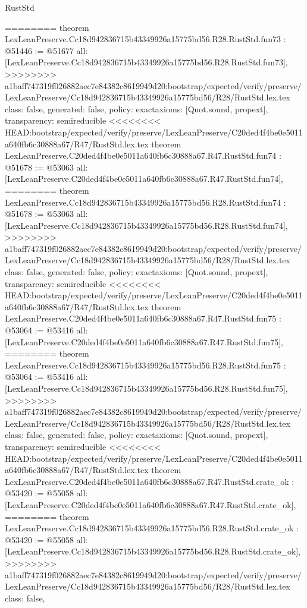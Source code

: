 \begin{lexlean}{RustStd}
\begin{coremodule}
{\begin{coremodule}
{{{{{{{{{{{{{{{{{{{{{{{{{{{{{{{{{{{{{{{{{{{{{{{{{{{{{{{{{{{{{{{{{{{{{{{{{{{{========
theorem LexLeanPreserve.Cc18d942836715b43349926a15775bd56.R28.RustStd.fun73 : @51446 := @51677 {
  all: [LexLeanPreserve.Cc18d942836715b43349926a15775bd56.R28.RustStd.fun73],
>>>>>>>> a1baff747319f026882aec7e84382c8619949d20:bootstrap/expected/verify/preserve/LexLeanPreserve/Cc18d942836715b43349926a15775bd56/R28/RustStd.lex.tex
  class: false,
  generated: false,
  policy: exact{axioms: [Quot.sound, propext]},
  transparency: semireducible
}
<<<<<<<< HEAD:bootstrap/expected/verify/preserve/LexLeanPreserve/C20ded4f4be0e5011a640fb6c30888a67/R47/RustStd.lex.tex
theorem LexLeanPreserve.C20ded4f4be0e5011a640fb6c30888a67.R47.RustStd.fun74 : @51678 := @53063 {
  all: [LexLeanPreserve.C20ded4f4be0e5011a640fb6c30888a67.R47.RustStd.fun74],
========
theorem LexLeanPreserve.Cc18d942836715b43349926a15775bd56.R28.RustStd.fun74 : @51678 := @53063 {
  all: [LexLeanPreserve.Cc18d942836715b43349926a15775bd56.R28.RustStd.fun74],
>>>>>>>> a1baff747319f026882aec7e84382c8619949d20:bootstrap/expected/verify/preserve/LexLeanPreserve/Cc18d942836715b43349926a15775bd56/R28/RustStd.lex.tex
  class: false,
  generated: false,
  policy: exact{axioms: [Quot.sound, propext]},
  transparency: semireducible
}
<<<<<<<< HEAD:bootstrap/expected/verify/preserve/LexLeanPreserve/C20ded4f4be0e5011a640fb6c30888a67/R47/RustStd.lex.tex
theorem LexLeanPreserve.C20ded4f4be0e5011a640fb6c30888a67.R47.RustStd.fun75 : @53064 := @53416 {
  all: [LexLeanPreserve.C20ded4f4be0e5011a640fb6c30888a67.R47.RustStd.fun75],
========
theorem LexLeanPreserve.Cc18d942836715b43349926a15775bd56.R28.RustStd.fun75 : @53064 := @53416 {
  all: [LexLeanPreserve.Cc18d942836715b43349926a15775bd56.R28.RustStd.fun75],
>>>>>>>> a1baff747319f026882aec7e84382c8619949d20:bootstrap/expected/verify/preserve/LexLeanPreserve/Cc18d942836715b43349926a15775bd56/R28/RustStd.lex.tex
  class: false,
  generated: false,
  policy: exact{axioms: [Quot.sound, propext]},
  transparency: semireducible
}
<<<<<<<< HEAD:bootstrap/expected/verify/preserve/LexLeanPreserve/C20ded4f4be0e5011a640fb6c30888a67/R47/RustStd.lex.tex
theorem LexLeanPreserve.C20ded4f4be0e5011a640fb6c30888a67.R47.RustStd.crate_ok : @53420 := @55058 {
  all: [LexLeanPreserve.C20ded4f4be0e5011a640fb6c30888a67.R47.RustStd.crate_ok],
========
theorem LexLeanPreserve.Cc18d942836715b43349926a15775bd56.R28.RustStd.crate_ok : @53420 := @55058 {
  all: [LexLeanPreserve.Cc18d942836715b43349926a15775bd56.R28.RustStd.crate_ok],
>>>>>>>> a1baff747319f026882aec7e84382c8619949d20:bootstrap/expected/verify/preserve/LexLeanPreserve/Cc18d942836715b43349926a15775bd56/R28/RustStd.lex.tex
  class: false,
}}}}}}}}}}}}}}}}}}}}}}}}}}}}}}}}}}}}}}}}}}}}}}}}}}}}}}}}}}}}}}}}}}}}}}}}}}}}}}}}
\end{coremodule}}
\end{coremodule}
\end{lexlean}
